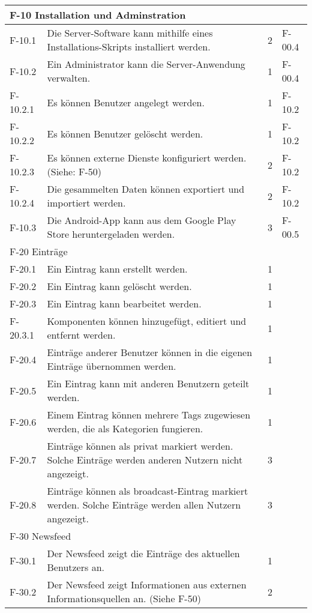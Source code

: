 \begin{tabularx}{\textwidth}{|l|X|l|l|}
    \multicolumn{4}{|l|}{F-10 Installation und Adminstration}\\
    \hline
    F-10.1 & Die Server-Software kann mithilfe eines Installations-Skripts installiert werden. & 2 & F-00.4 \\
    F-10.2   & Ein Administrator kann die Server-Anwendung verwalten. & 1 & F-00.4\\
    F-10.2.1 & Es können Benutzer angelegt werden. & 1 & F-10.2 \\
    F-10.2.2 & Es können Benutzer gelöscht werden. & 1 & F-10.2 \\
    F-10.2.3 & Es können externe Dienste konfiguriert werden. (Siehe: F-50)& 2 & F-10.2 \\
    F-10.2.4 & Die gesammelten Daten können exportiert und importiert werden. & 2 & F-10.2 \\
    F-10.3 & Die Android-App kann aus dem Google Play Store heruntergeladen werden. & 3 & F-00.5\\
    \hline
    \multicolumn{4}{|l|}{F-20 Einträge}\\
    \hline
    F-20.1 & Ein Eintrag kann erstellt werden. & 1 & \\
    F-20.2 & Ein Eintrag kann gelöscht werden. & 1 & \\
    F-20.3   & Ein Eintrag kann bearbeitet werden. & 1 & \\
    F-20.3.1 & Komponenten können hinzugefügt, editiert und entfernt werden. & 1 & \\
    F-20.4 & Einträge anderer Benutzer können in die eigenen Einträge übernommen werden. & 1 & \\
    F-20.5 & Ein Eintrag kann mit anderen Benutzern geteilt werden. & 1 & \\
    F-20.6 & Einem Eintrag können mehrere Tags zugewiesen werden, die als Kategorien fungieren. & 1 & \\
    F-20.7 & Einträge können als privat markiert werden.            Solche Einträge werden anderen Nutzern nicht angezeigt. & 3 & \\
    F-20.8 & Einträge können als broadcast-Eintrag markiert werden. Solche Einträge werden allen Nutzern angezeigt. & 3 & \\
    \hline
    \multicolumn{4}{|l|}{F-30 Newsfeed}\\
    \hline
    F-30.1 & Der Newsfeed zeigt die Einträge des aktuellen Benutzers an. & 1 & \\
    F-30.2 & Der Newsfeed zeigt Informationen aus externen Informationsquellen an. (Siehe F-50) & 2 & \\

\end{tabularx}
